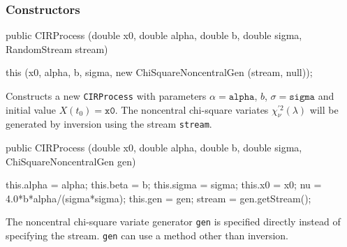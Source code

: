 \subsubsection* {Constructors}
\begin{code}

   public CIRProcess (double x0, double alpha, double b, double sigma,
                      RandomStream stream) \begin{hide} {
      this (x0, alpha, b, sigma, new ChiSquareNoncentralGen (stream, null));
    }\end{hide}
\end{code}
\begin{tabb} Constructs a new \texttt{CIRProcess} with parameters
$\alpha = \texttt{alpha}$, $b$, $\sigma = \texttt{sigma}$ and initial value
$X(t_{0}) = \texttt{x0}$. The noncentral chi-square variates
  $\chi^{\prime2}_\nu(\lambda)$ will be
generated by inversion using the stream \texttt{stream}.
\end{tabb}
\begin{code}

   public CIRProcess (double x0, double alpha, double b, double sigma,
                      ChiSquareNoncentralGen gen) \begin{hide} {
      this.alpha = alpha;
      this.beta  = b;
      this.sigma = sigma;
      this.x0    = x0;
      nu = 4.0*b*alpha/(sigma*sigma);
      this.gen   = gen;
      stream = gen.getStream();
    }\end{hide}
\end{code}
\begin{tabb} The noncentral chi-square variate generator  \texttt{gen}
 is specified directly instead of specifying the stream.
 \texttt{gen} can use a method other than inversion.
\end{tabb}


